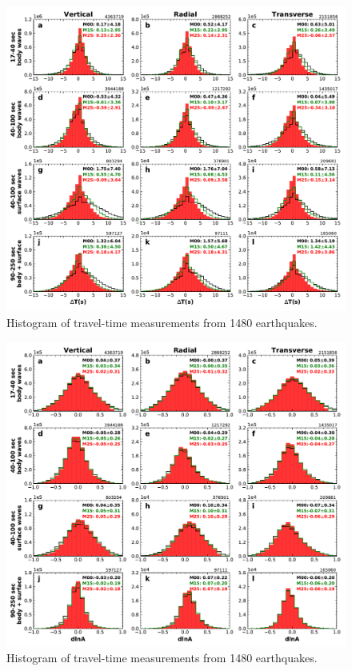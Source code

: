\documentclass[extra,mreferee]{gji}
\begin{document}
\begin{figure}
\includegraphics[width=\textwidth]{figures/dt_histogram.pdf}
\caption{Histogram of travel-time measurements from 1480 earthquakes.}
\centering
\end{figure}

\begin{figure}
\includegraphics[width=\textwidth]{figures/dlna_histogram.pdf}
\caption{Histogram of travel-time measurements from 1480 earthquakes.}
\centering
\end{figure}
\end{document}
